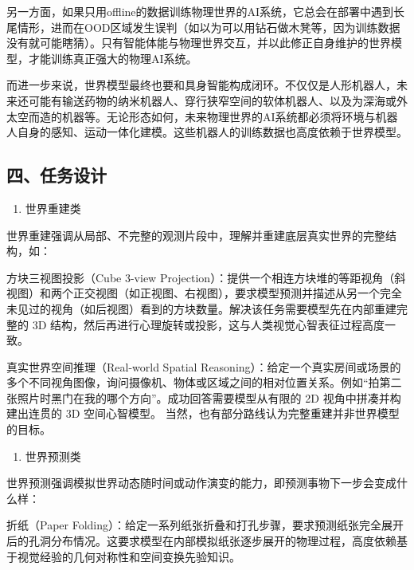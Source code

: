 另一方面，如果只用offline的数据训练物理世界的AI系统，它总会在部署中遇到长尾情形，进而在OOD区域发生误判（如以为可以用钻石做木凳等，因为训练数据没有就可能瞎猜）。只有智能体能与物理世界交互，并以此修正自身维护的世界模型，才能训练真正强大的物理AI系统。

而进一步来说，世界模型最终也要和具身智能构成闭环。不仅仅是人形机器人，未来还可能有输送药物的纳米机器人、穿行狭窄空间的软体机器人、以及为深海或外太空而造的机器等。无论形态如何，未来物理世界的AI系统都必须将环境与机器人自身的感知、运动一体化建模。这些机器人的训练数据也高度依赖于世界模型。

\hypertarget{ux56dbux4efbux52a1ux8bbeux8ba1}{%
\subsection{四、任务设计}\label{ux56dbux4efbux52a1ux8bbeux8ba1}}

\begin{enumerate}
\def\labelenumi{\arabic{enumi}.}
\tightlist
\item
  世界重建类
\end{enumerate}

世界重建强调从局部、不完整的观测片段中，理解并重建底层真实世界的完整结构，如：

方块三视图投影（Cube 3-view Projection）：提供一个相连方块堆的等距视角（斜视图）和两个正交视图（如正视图、右视图），要求模型预测并描述从另一个完全未见过的视角（如后视图）看到的方块数量。解决该任务需要模型先在内部重建完整的 3D 结构，然后再进行心理旋转或投影，这与人类视觉心智表征过程高度一致。

真实世界空间推理（Real-world Spatial Reasoning）：给定一个真实房间或场景的多个不同视角图像，询问摄像机、物体或区域之间的相对位置关系。例如``拍第二张照片时黑门在我的哪个方向''。成功回答需要模型从有限的 2D 视角中拼凑并构建出连贯的 3D 空间心智模型。
当然，也有部分路线认为完整重建并非世界模型的目标。

\begin{enumerate}
\def\labelenumi{\arabic{enumi}.}
\setcounter{enumi}{1}
\tightlist
\item
  世界预测类
\end{enumerate}

世界预测强调模拟世界动态随时间或动作演变的能力，即预测事物下一步会变成什么样：

折纸（Paper Folding）：给定一系列纸张折叠和打孔步骤，要求预测纸张完全展开后的孔洞分布情况。这要求模型在内部模拟纸张逐步展开的物理过程，高度依赖基于视觉经验的几何对称性和空间变换先验知识。

